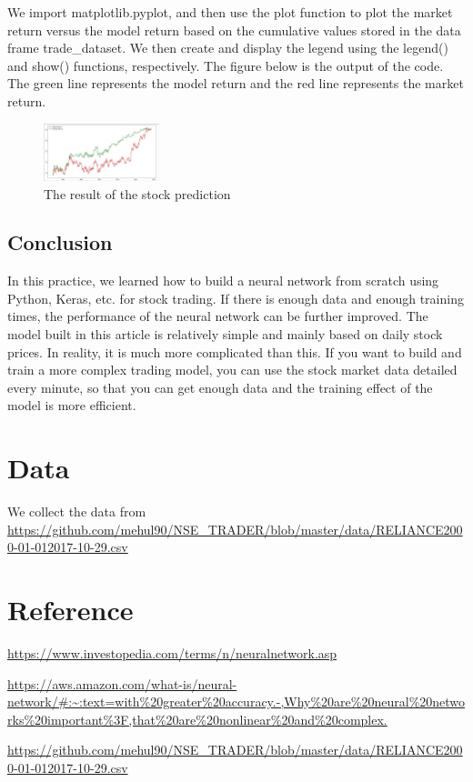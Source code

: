 \documentclass{article}
\begin{document}
We import matplotlib.pyplot, and then use the plot function to plot the market return versus the model return based on the cumulative values stored in the data frame trade\_dataset. We then create and display the legend using the legend() and show() functions, respectively. The figure below is the output of the code. The green line represents the model return and the red line represents the market return.
\begin{figure}[h!]
\centering
\includegraphics[width=0.3\textwidth]{result.png}
\caption{\label{fig:result}The result of the stock prediction}
\end{figure}


\subsection{Conclusion}
In this practice, we learned how to build a neural network from scratch using Python, Keras, etc. for stock trading. If there is enough data and enough training times, the performance of the neural network can be further improved. The model built in this article is relatively simple and mainly based on daily stock prices. In reality, it is much more complicated than this. If you want to build and train a more complex trading model, you can use the stock market data detailed every minute, so that you can get enough data and the training effect of the model is more efficient.

\section{Data}
We collect the data from \url{https://github.com/mehul90/NSE_TRADER/blob/master/data/RELIANCE2000-01-012017-10-29.csv}

\section{Reference}
\url{https://www.investopedia.com/terms/n/neuralnetwork.asp}

\url{https://aws.amazon.com/what-is/neural-network/#:~:text=with%20greater%20accuracy.-,Why%20are%20neural%20networks%20important%3F,that%20are%20nonlinear%20and%20complex.}

\url{https://github.com/mehul90/NSE_TRADER/blob/master/data/RELIANCE2000-01-012017-10-29.csv}
\end{document}
